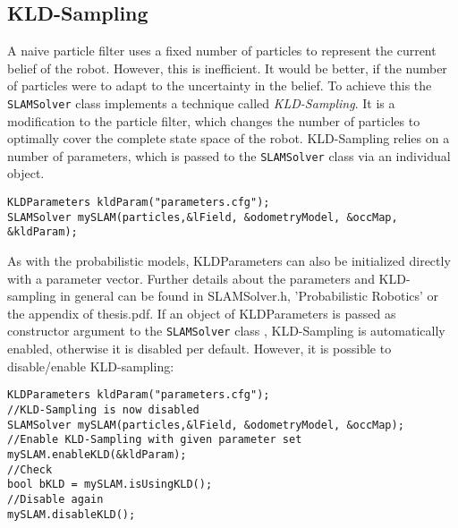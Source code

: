 \documentclass{article}
\newcommand{\SLAM}{\texttt{SLAMSolver} class }
\begin{document}
\subsection{KLD-Sampling}
A naive particle filter uses a fixed number of particles to represent the current belief of the robot. However, this is inefficient. It would be better, if the number of particles were to adapt to the uncertainty in the belief. To achieve this the \SLAM implements a technique called \textit{KLD-Sampling}. It is a modification to the particle filter, which changes the number of particles to optimally cover the complete state space of the robot. KLD-Sampling relies on a number of parameters, which is passed to the \SLAM via an individual object.
\begin{lstlisting}
KLDParameters kldParam("parameters.cfg");
SLAMSolver mySLAM(particles,&lField, &odometryModel, &occMap, &kldParam);
\end{lstlisting}  
As with the probabilistic models, KLDParameters can also be initialized directly with a parameter vector. Further details about the parameters and KLD-sampling in general can be found in SLAMSolver.h, 'Probabilistic Robotics' or the appendix of thesis.pdf. If an object of KLDParameters is passed as constructor argument to the \SLAM, KLD-Sampling is automatically enabled, otherwise it is disabled per default. However, it is possible to disable/enable KLD-sampling:
\begin{lstlisting}
KLDParameters kldParam("parameters.cfg");
//KLD-Sampling is now disabled
SLAMSolver mySLAM(particles,&lField, &odometryModel, &occMap);
//Enable KLD-Sampling with given parameter set
mySLAM.enableKLD(&kldParam);
//Check
bool bKLD = mySLAM.isUsingKLD();
//Disable again
mySLAM.disableKLD();
\end{lstlisting}
\newpage
\end{document}
